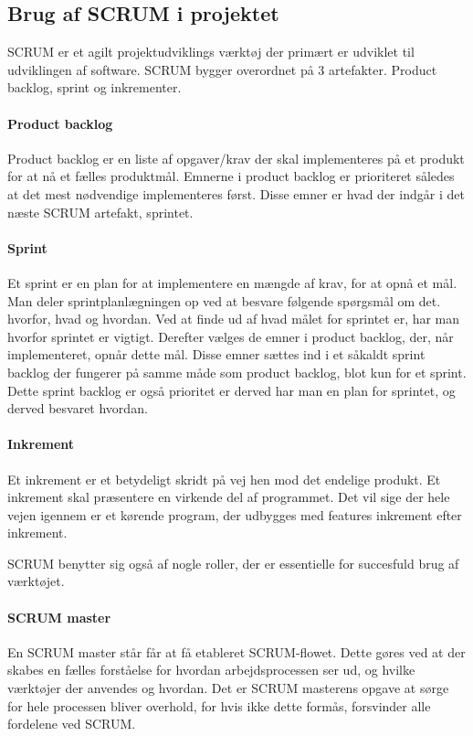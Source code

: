 \subsection{Brug af SCRUM i projektet}
SCRUM er et agilt projektudviklings værktøj der primært er udviklet til udviklingen af software. SCRUM bygger overordnet på 3 artefakter. Product backlog, sprint og inkrementer. 

\paragraph{Product backlog}
Product backlog er en liste af opgaver/krav der skal implementeres på et produkt for at nå et fælles produktmål. Emnerne i product backlog er prioriteret således at det mest nødvendige implementeres først. Disse emner er hvad der indgår i det næste SCRUM artefakt, sprintet.

\paragraph{Sprint}
Et sprint er en plan for at implementere en mængde af krav, for at opnå et mål. Man deler sprintplanlægningen op ved at besvare følgende spørgsmål om det. hvorfor, hvad og hvordan. Ved at finde ud af hvad målet for sprintet er, har man hvorfor sprintet er vigtigt. Derefter vælges de emner i product backlog, der, når implementeret, opnår dette mål. Disse emner sættes ind i et såkaldt sprint backlog der fungerer på samme måde som product backlog, blot kun for et sprint. Dette sprint backlog er også prioritet er derved har man en plan for sprintet, og derved besvaret hvordan.

\paragraph{Inkrement}
Et inkrement er et betydeligt skridt på vej hen mod det endelige produkt. Et inkrement skal præsentere en virkende del af programmet. Det vil sige der hele vejen igennem er et kørende program, der udbygges med features inkrement efter inkrement. 

SCRUM benytter sig også af nogle roller, der er essentielle for succesfuld brug af værktøjet. 

\paragraph{SCRUM master}
En SCRUM master står får at få etableret SCRUM-flowet. Dette gøres ved at der skabes en fælles forståelse for hvordan arbejdsprocessen ser ud, og hvilke værktøjer der anvendes og hvordan. Det er SCRUM masterens opgave at sørge for hele processen bliver overhold, for hvis ikke dette formås, forsvinder alle fordelene ved SCRUM. 

